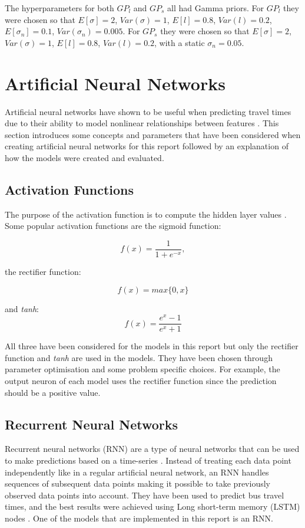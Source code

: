 \noindent
The hyperparameters for both $GP_l$ and $GP_s$ all had Gamma
priors. For $GP_l$ they were chosen so that $E[\sigma] = 2$,
$Var(\sigma) = 1$, $E[l] = 0.8$, $Var(l) = 0.2$, $E[\sigma_n] = 0.1$,
$Var(\sigma_n) = 0.005$. For $GP_s$ they were chosen so that $E[\sigma] = 2$,
$Var(\sigma) = 1$, $E[l] = 0.8$, $Var(l) = 0.2$, with a static
$\sigma_n = 0.05$. 

\section{Artificial Neural Networks}

Artificial neural networks have shown to be useful when predicting travel times due to their ability to model nonlinear relationships between features \cite{brazilANN, malaysiaANN}. This section introduces some concepts and parameters that have been considered when creating artificial neural networks for this report followed by an explanation of how the models were created and evaluated.

\subsection{Activation Functions}
The purpose of the activation function is to compute the hidden layer values \cite{Goodfellow-et-al-2016}. Some popular activation functions are the sigmoid function:

\begin{equation} 
f(x) = \frac{1}{1+e^{-x}},
\end{equation}

the rectifier function:

\begin{equation} 
f(x) = max\{0,x\}
\end{equation}

and \textit{tanh}:
\begin{equation} 
f(x) =  \frac{e^x-1}{e^{x}+1} 
\end{equation}

All three have been considered for the models in this report but only the rectifier function and \textit{tanh} are used in the models. They have been chosen through parameter optimisation and some problem specific choices. For example, the output neuron of each model uses the rectifier function since the prediction should be a positive value.

\subsection{Recurrent Neural Networks}
Recurrent neural networks (RNN) are a type of neural networks that can be used to make predictions based on a time-series \cite{RNN}. Instead of treating each data point independently like in a regular artificial neural network, an RNN handles sequences of subsequent data points making it possible to take previously observed data points into account. They have been used to predict bus travel times, and the best results were achieved using Long short-term memory (LSTM) nodes \cite{RNNBusPredictions}. One of the models that are implemented in this report is an RNN. 


